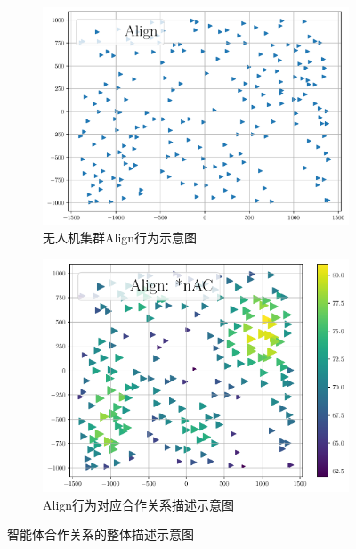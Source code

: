 \begin{figure}
     \hfill
     \begin{subfigure}[b]{.45\textwidth}
         \centering
         \includegraphics[width=1\textwidth]{Img/chapter10/Class-align-sample4.pdf}
         \caption{无人机集群Align行为示意图}
         \label{align-sample5-coh}
     \end{subfigure}
     \hfill
     \begin{subfigure}[b]{.45\textwidth}
         \centering
         \includegraphics[width=1\textwidth]{Img/chapter10/PI-Class-align-sample4.pdf}
         \caption{Align行为对应合作关系描述示意图}
         \label{align-sample5-coh1}
     \end{subfigure}          
\caption{智能体合作关系的整体描述示意图}
\label{fig:nAC-demon}
\end{figure}

